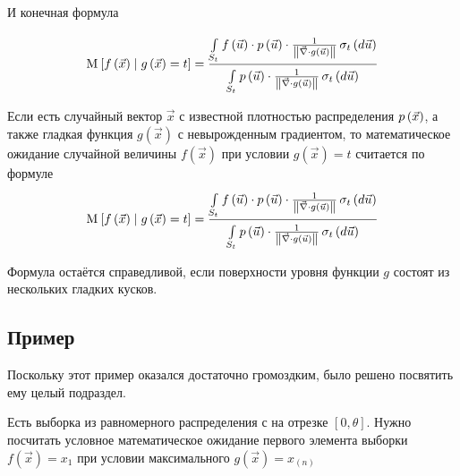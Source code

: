 И конечная формула

$$\Mean{ f\left( \vec{x} \right) \mcond g\left( \vec{x} \right) = t }
  = \frac{\integrall{S_t}{\sigma_{t}\left(d\vec{u} \right)}{
      f\left( \vec{u} \right) \cdot \pdf{\vec{u}} \cdot \frac{1}{
      \left\| \vec{\nabla} \cdot g\left( \vec{u} \right) \right\|}}}
      {\integrall{S_t}{\sigma_{t}\left(d\vec{u} \right)}{
      \pdf{\vec{u}} \cdot \frac{1}{
      \left\| \vec{\nabla} \cdot g\left( \vec{u} \right) \right\|}}}$$

\begin{theorem}
  \label{conditionalExpectationDefinition}
  Если есть случайный вектор $\vec{x}$ с известной плотностью распределения
  $\pdf{\vec{x}}$, а также гладкая функция $g\left( \vec{x} \right)$
  с невырожденным градиентом, то математическое ожидание случайной величины
  $f\left( \vec{x} \right)$ при условии $g\left( \vec{x} \right) = t$
  считается по формуле
  $$\Mean{f\left( \vec{x} \right) \mcond g\left( \vec{x} \right) = t}
      = \frac{\integrall{S_t}{\sigma_{t}\left(d\vec{u} \right)}{
      f\left( \vec{u} \right) \cdot \pdf{\vec{u}} \cdot \frac{1}{
      \left\| \vec{\nabla} \cdot g\left( \vec{u} \right) \right\|}}}
      {\integrall{S_t}{\sigma_{t}\left(d\vec{u} \right)}{
      \pdf{\vec{u}} \cdot \frac{1}{
    \left\| \vec{\nabla}
        \cdot g\left( \vec{u} \right) \right\|}}}$$
\end{theorem}

\begin{remark}
  Формула остаётся справедливой,
  если поверхности уровня функции $g$ состоят из нескольких гладких кусков.
\end{remark}

\subsection{Пример}
Поскольку этот пример оказался достаточно громоздким,
было решено посвятить ему целый подраздел.

Есть выборка \xsample из равномерного распределения
с на отрезке $\left[ 0, \theta \right]$.
Нужно посчитать условное математическое ожидание
первого элемента выборки $f\left( \vec{x} \right) = x_1$
при условии максимального $g\left( \vec{x} \right) = x_{\left( n \right)}$

